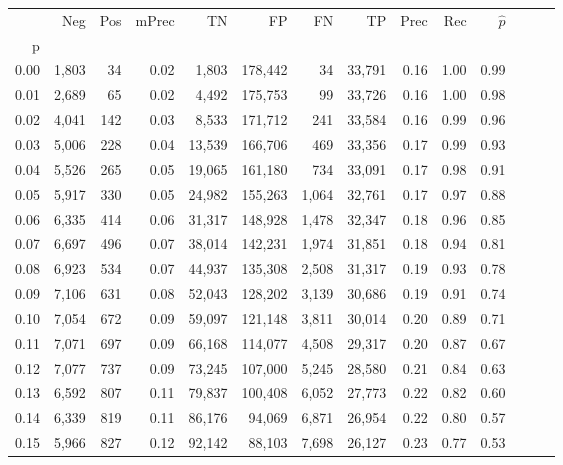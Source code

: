 \begin{tabular}{rrrrrrrrrrrrrr}
\toprule
{} &    Neg &  Pos & mPrec &       TN &       FP &      FN &      TP &  Prec &   Rec & $\hat{p}$ \\
p    &        &      &       &          &          &         &         &       &       &           \\
\midrule
0.00 &  1,803 &   34 &  0.02 &    1,803 &  178,442 &      34 &  33,791 &  0.16 &  1.00 &      0.99 \\
0.01 &  2,689 &   65 &  0.02 &    4,492 &  175,753 &      99 &  33,726 &  0.16 &  1.00 &      0.98 \\
0.02 &  4,041 &  142 &  0.03 &    8,533 &  171,712 &     241 &  33,584 &  0.16 &  0.99 &      0.96 \\
0.03 &  5,006 &  228 &  0.04 &   13,539 &  166,706 &     469 &  33,356 &  0.17 &  0.99 &      0.93 \\
0.04 &  5,526 &  265 &  0.05 &   19,065 &  161,180 &     734 &  33,091 &  0.17 &  0.98 &      0.91 \\
0.05 &  5,917 &  330 &  0.05 &   24,982 &  155,263 &   1,064 &  32,761 &  0.17 &  0.97 &      0.88 \\
0.06 &  6,335 &  414 &  0.06 &   31,317 &  148,928 &   1,478 &  32,347 &  0.18 &  0.96 &      0.85 \\
0.07 &  6,697 &  496 &  0.07 &   38,014 &  142,231 &   1,974 &  31,851 &  0.18 &  0.94 &      0.81 \\
0.08 &  6,923 &  534 &  0.07 &   44,937 &  135,308 &   2,508 &  31,317 &  0.19 &  0.93 &      0.78 \\
0.09 &  7,106 &  631 &  0.08 &   52,043 &  128,202 &   3,139 &  30,686 &  0.19 &  0.91 &      0.74 \\
0.10 &  7,054 &  672 &  0.09 &   59,097 &  121,148 &   3,811 &  30,014 &  0.20 &  0.89 &      0.71 \\
0.11 &  7,071 &  697 &  0.09 &   66,168 &  114,077 &   4,508 &  29,317 &  0.20 &  0.87 &      0.67 \\
0.12 &  7,077 &  737 &  0.09 &   73,245 &  107,000 &   5,245 &  28,580 &  0.21 &  0.84 &      0.63 \\
0.13 &  6,592 &  807 &  0.11 &   79,837 &  100,408 &   6,052 &  27,773 &  0.22 &  0.82 &      0.60 \\
0.14 &  6,339 &  819 &  0.11 &   86,176 &   94,069 &   6,871 &  26,954 &  0.22 &  0.80 &      0.57 \\
0.15 &  5,966 &  827 &  0.12 &   92,142 &   88,103 &   7,698 &  26,127 &  0.23 &  0.77 &      0.53 \\

\end{tabular}
